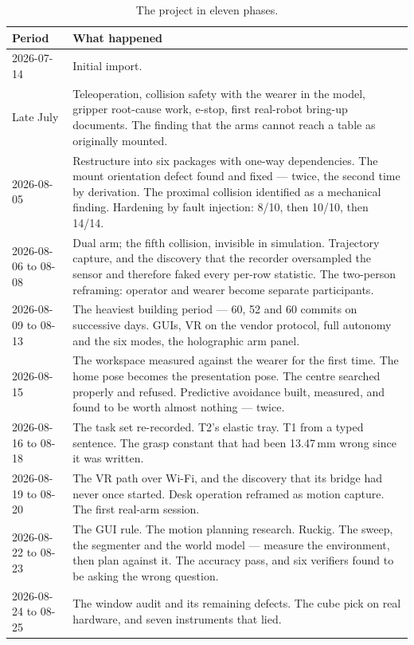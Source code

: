 \documentclass[11pt,a4paper,oneside]{report}
\begin{document}
\begin{table}[H]
\centering
\small
\begin{tabularx}{\textwidth}{@{}lX@{}}
\toprule
\textbf{Period} & \textbf{What happened} \\
\midrule
2026-07-14 & Initial import. \\
Late July & Teleoperation, collision safety with the wearer in the model,
gripper root-cause work, e-stop, first real-robot bring-up documents. The
finding that the arms cannot reach a table as originally mounted. \\
2026-08-05 & Restructure into six packages with one-way dependencies. The mount
orientation defect found and fixed --- twice, the second time by derivation. The
proximal collision identified as a mechanical finding. Hardening by fault
injection: 8/10, then 10/10, then 14/14. \\
2026-08-06 to 08-08 & Dual arm; the fifth collision, invisible in simulation.
Trajectory capture, and the discovery that the recorder oversampled the sensor
and therefore faked every per-row statistic. The two-person reframing: operator
and wearer become separate participants. \\
2026-08-09 to 08-13 & The heaviest building period --- 60, 52 and 60 commits on
successive days. GUIs, VR on the vendor protocol, full autonomy and the six
modes, the holographic arm panel. \\
2026-08-15 & The workspace measured against the wearer for the first time. The
home pose becomes the presentation pose. The centre searched properly and
refused. Predictive avoidance built, measured, and found to be worth almost
nothing --- twice. \\
2026-08-16 to 08-18 & The task set re-recorded. T2's elastic tray. T1 from a
typed sentence. The grasp constant that had been 13.47\,mm wrong since it was
written. \\
2026-08-19 to 08-20 & The VR path over Wi-Fi, and the discovery that its bridge
had never once started. Desk operation reframed as motion capture. The first
real-arm session. \\
2026-08-22 to 08-23 & The GUI rule. The motion planning research. Ruckig. The
sweep, the segmenter and the world model --- measure the environment, then plan
against it. The accuracy pass, and six verifiers found to be asking the wrong
question. \\
2026-08-24 to 08-25 & The window audit and its remaining defects. The cube pick
on real hardware, and seven instruments that lied. \\
\bottomrule
\end{tabularx}
\caption{The project in eleven phases.}
\end{table}
\end{document}
